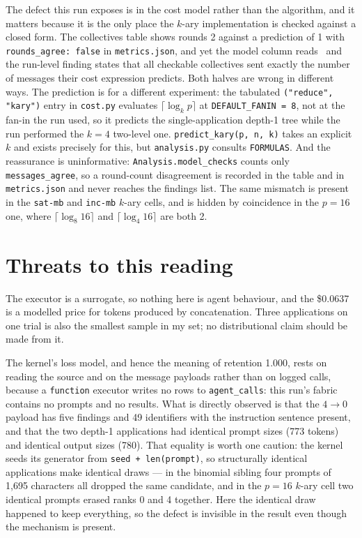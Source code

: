 \documentclass[11pt]{article}
\begin{document}
The defect this run exposes is in the cost model rather than the algorithm, and it matters
because it is the only place the $k$-ary implementation is checked against a closed form. The
collectives table shows rounds 2 against a prediction of 1 with \texttt{rounds\_agree: false}
in \texttt{metrics.json}, and yet the model column reads \modelok\ and the run-level finding
states that all checkable collectives sent exactly the number of messages their cost
expression predicts. Both halves are wrong in different ways. The prediction is for a
different experiment: the tabulated \texttt{("reduce", "kary")} entry in \texttt{cost.py}
evaluates $\lceil\log_k p\rceil$ at \texttt{DEFAULT\_FANIN = 8}, not at the fan-in the run
used, so it predicts the single-application depth-1 tree while the run performed the $k=4$
two-level one. \texttt{predict\_kary(p, n, k)} takes an explicit $k$ and exists precisely for
this, but \texttt{analysis.py} consults \texttt{FORMULAS}. And the reassurance is
uninformative: \texttt{Analysis.model\_checks} counts only \texttt{messages\_agree}, so a
round-count disagreement is recorded in the table and in \texttt{metrics.json} and never
reaches the findings list. The same mismatch is present in the \texttt{sat-mb} and
\texttt{inc-mb} $k$-ary cells, and is hidden by coincidence in the $p=16$ one, where
$\lceil\log_8 16\rceil$ and $\lceil\log_4 16\rceil$ are both 2.

\section{Threats to this reading}

The executor is a surrogate, so nothing here is agent behaviour, and the \$0.0637 is a
modelled price for tokens produced by concatenation. Three applications on one trial is also
the smallest sample in my set; no distributional claim should be made from it.

The kernel's loss model, and hence the meaning of retention 1.000, rests on reading the
source and on the message payloads rather than on logged calls, because a \texttt{function}
executor writes no rows to \texttt{agent\_calls}: this run's fabric contains no prompts and
no results. What is directly observed is that the $4\to0$ payload has five findings and 49
identifiers with the instruction sentence present, and that the two depth-1 applications had
identical prompt sizes (773 tokens) and identical output sizes (780). That equality is worth
one caution: the kernel seeds its generator from \texttt{seed + len(prompt)}, so structurally
identical applications make identical draws --- in the binomial sibling four prompts of
1{,}695 characters all dropped the same candidate, and in the $p=16$ $k$-ary cell two
identical prompts erased ranks 0 and 4 together. Here the identical draw happened to keep
everything, so the defect is invisible in the result even though the mechanism is present.
\end{document}
